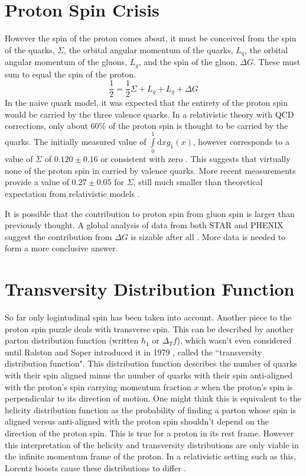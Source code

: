 \documentclass[abstract = on,listof=totoc, bibliography=totoc]{scrreprt}
\begin{document}
\section{Proton Spin Crisis}
However the spin of the proton comes about, it must be conceived from the spin of the quarks, $\Sigma$, the orbital angular momentum of the quarks, $L_q$, the orbital angular momentum of the gluons, $L_g$, and the spin of the gluon, $\Delta G$. These must sum to equal the spin of the proton.
\begin{equation}
\frac{1}{2} = \frac{1}{2}\Sigma + L_q + L_g + \Delta G
\end{equation}
In the naive quark model, it was expected that the entirety of the proton spin would be carried by the three valence quarks. In a relativistic theory with QCD corrections, only about 60\% of the proton spin is thought to be carried by the quarks. The initially measured value of $\int\limits_0^1 \text{d}x g_1(x)$, however corresponds to a value of $\Sigma$ of $0.120 \pm 0.16$ or consistent with zero \cite{jaffeWhereSpinComeFrom}. This suggests that virtually none of the proton spin in carried by valence quarks. More recent measurements provide a value of $0.27\pm 0.05$ for $\Sigma$, still much smaller than theoretical expectation from relativistic models \cite{jaffeWhereSpinComeFrom}.  

It is possible that the contribution to proton spin from gluon spin is larger than previously thought. A global analysis of data from both STAR and PHENIX suggest the contribution from $\Delta G$ is sizable after all \cite{deFlorian:2014yva}. More data is needed to form a more conclusive answer. 

\section{Transversity Distribution Function}
So far only logintudinal spin has been taken into account. Another piece to the proton spin puzzle deals with transverse spin. This can be described by another parton distribution function (written $h_1$ or $\Delta_T f$), which wasn't even considered until Ralston and Soper introduced it in 1979 \cite{transIntroduced}, called the ``transversity distribution function". This distribution function describes the number of quarks with their spin aligned minus the number of quarks with their spin anti-aligned with the proton's spin carrying momentum fraction $x$ when the proton's spin is perpendicular to its direction of motion. One might think this is equivalent to the helicity distribution function as the probability of finding a parton whose spin is aligned versus anti-aligned with the proton spin shouldn't depend on the direction of the proton spin. This is true for a proton in its rest frame. However this interpretation of the helicity and transversity distributions are only viable in the infinite momentum frame of the proton. In a relativistic setting such as this, Lorentz boosts cause these distributions to differ \cite{BacchettaThesis}.
\end{document}
